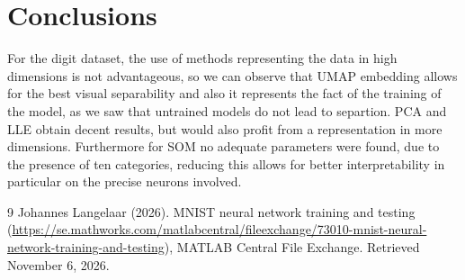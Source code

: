 \documentclass{article}
\begin{document}
\section{Conclusions}
For the digit dataset, the use of methods representing the data in high dimensions is not advantageous, so we can observe that UMAP embedding allows for the best visual separability and also it represents the fact of the training of the model, as we saw that untrained models do not lead to separtion. PCA and LLE obtain decent results, but would also profit from a representation in more dimensions. Furthermore for SOM no adequate parameters were found, due to the presence of ten categories, reducing this allows for better interpretability in particular on the precise neurons involved. 
\FloatBarrier

\begin{thebibliography}{9}
Johannes Langelaar (2026). MNIST neural network training and testing (\href{}{https://se.mathworks.com/matlabcentral/fileexchange/73010-mnist-neural-network-training-and-testing}), MATLAB Central File Exchange. Retrieved November 6, 2026.


\end{thebibliography}

\end{document}
